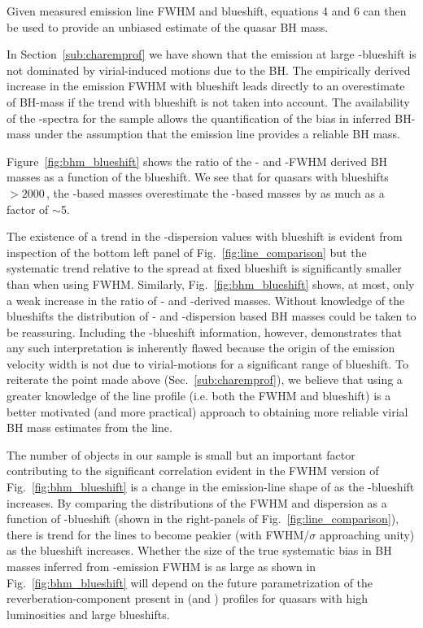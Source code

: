 Given measured  emission line FWHM and blueshift, equations 4 and 6 can then be used to provide an unbiased estimate of the quasar BH mass.

In Section~\ref{sub:charemprof} we have shown that the  emission at large -blueshift is not dominated by virial-induced motions due to the BH. 
The empirically derived increase in the  emission FWHM with blueshift leads directly to an overestimate of BH-mass if the trend with blueshift is not taken into account. 
The availability of the \hans-spectra for the sample allows the quantification of the bias in inferred BH-mass under the assumption that the \ha emission line provides a reliable BH mass. 

Figure~\ref{fig:bhm_blueshift} shows the ratio of the - and \hans-FWHM derived BH masses as a function of the  blueshift.  
We see that for quasars with  blueshifts $>2000$\,\kms, the -based masses overestimate the \hans-based masses by as much as a factor of $\sim$5. 

The existence of a trend in the -dispersion values with  blueshift is evident from inspection of the bottom left panel of Fig.~\ref{fig:line_comparison} but the systematic trend relative to the spread at fixed blueshift is significantly smaller than when using  FWHM. 
Similarly, Fig.~\ref{fig:bhm_blueshift} shows, at most, only a weak increase in the ratio of - and \hans-derived masses. 
Without knowledge of the  blueshifts the distribution of - and \hans-dispersion based BH masses could be taken to be reassuring. 
Including the -blueshift information, however, demonstrates that any such interpretation is inherently flawed because the origin of the  emission velocity width is not due to virial-motions for a significant range of  blueshift. 
To reiterate the point made above (Sec.~\ref{sub:charemprof}), we believe that using a greater knowledge of the line profile (i.e. both the FWHM and blueshift) is a better motivated (and more practical) approach to obtaining more reliable virial BH mass estimates from the  line. 

The number of objects in our sample is small but an important factor contributing to the significant correlation evident in the FWHM version of Fig.~\ref{fig:bhm_blueshift} is a change in the emission-line shape of \ha as the -blueshift increases.
By comparing the distributions of the \ha FWHM and dispersion as a function of -blueshift (shown in the right-panels of Fig.~\ref{fig:line_comparison}), there is trend for the \ha lines to become peakier (with FWHM/$\sigma$ approaching unity) as the  blueshift increases. 
Whether the size of the true systematic bias in BH masses inferred from -emission FWHM is as large as shown in Fig.~\ref{fig:bhm_blueshift} will depend on the future parametrization of the reverberation-component present in \hb (and \hans) profiles for quasars with high luminosities and large  blueshifts.

